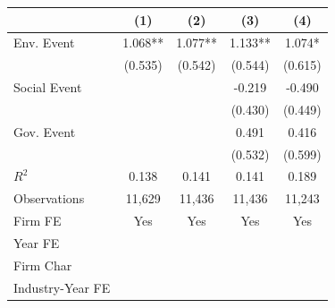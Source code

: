 {
\def\sym#1{\ifmmode^{#1}\else\(^{#1}\)\fi}
\begin{tabular}{l*{4}{c}}
\toprule
                    &\multicolumn{1}{c}{(1)}   &\multicolumn{1}{c}{(2)}   &\multicolumn{1}{c}{(3)}   &\multicolumn{1}{c}{(4)}   \\
\midrule
Env. Event          &       1.068** &       1.077** &       1.133** &       1.074*  \\
                    &     (0.535)   &     (0.542)   &     (0.544)   &     (0.615)   \\
\addlinespace
Social Event        &               &               &      -0.219   &      -0.490   \\
                    &               &               &     (0.430)   &     (0.449)   \\
\addlinespace
Gov. Event          &               &               &       0.491   &       0.416   \\
                    &               &               &     (0.532)   &     (0.599)   \\
\midrule
\(R^{2}\)           &       0.138   &       0.141   &       0.141   &       0.189   \\
Observations        &      11,629   &      11,436   &      11,436   &      11,243   \\
Firm FE             &         Yes   &         Yes   &         Yes   &         Yes   \\
Year FE             &               &               &               &               \\
Firm Char           &               &               &               &               \\
Industry-Year FE    &               &               &               &               \\
\bottomrule
\end{tabular}
}
